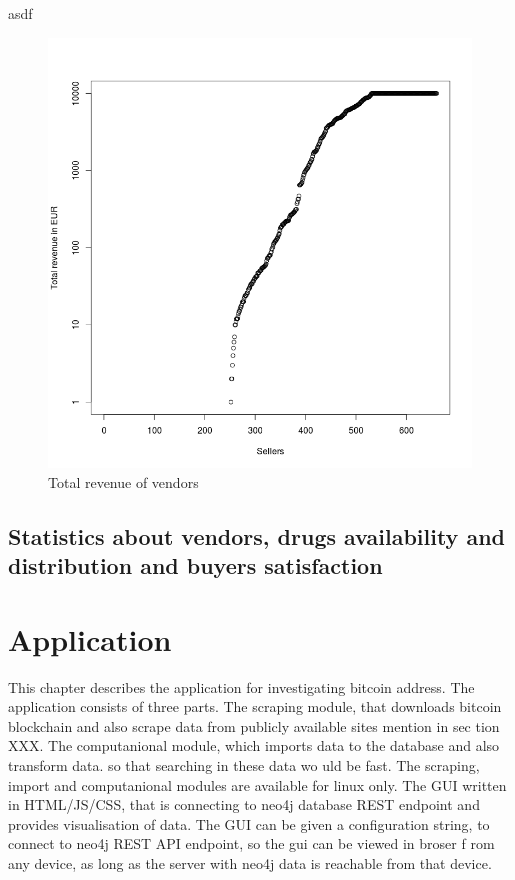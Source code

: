 \documentclass[
  digital, %
  table,   %
  lof,     %
  lot,     %
  oneside
]{fithesis3}
\begin{document}
asdf
\begin{figure}[!htb]
    \centering
    \includegraphics[scale=0.4]{total-rev}
    \caption{Total revenue of vendors}
    \label{Vendors by total revenue}
\end{figure}

\section{Statistics about vendors, drugs availability and distribution and buyers satisfaction}



\chapter{Application}

This chapter describes the application for investigating bitcoin address.
The application consists of three parts.
The scraping module, that downloads bitcoin blockchain and also scrape data from publicly available sites mention in sec
tion XXX.
The computanional module, which imports data to the database and also transform data. so that searching in these data wo
uld be fast.
The scraping, import and computanional modules are available for linux only.
The GUI written in HTML/JS/CSS, that is connecting to neo4j database REST endpoint and provides visualisation of data.
The GUI can be given a configuration string, to connect to neo4j REST API endpoint, so the gui can be viewed in broser f
rom any device, as long as 
the server with neo4j data is reachable from that device.
\end{document}
